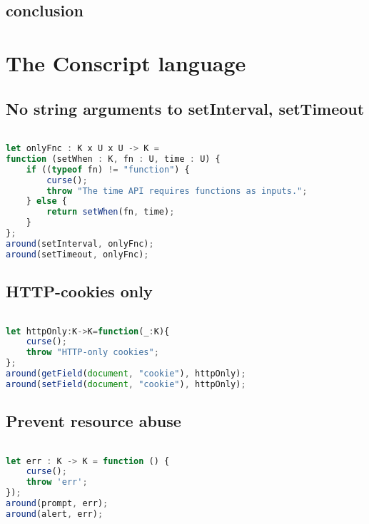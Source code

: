 \subsection{conclusion}

\section{The Conscript language}
\label{sec:ValidationConscript}

\subsection{No string arguments to setInterval, setTimeout}

\begin{lstlisting}[label={lst:Policy7Conscript},language=JavaScript,caption=Policy 7 in ConScript,mathescape=true]  % float=t?

let onlyFnc : K x U x U -> K =
function (setWhen : K, fn : U, time : U) {
    if ((typeof fn) != "function") {
        curse();
        throw "The time API requires functions as inputs.";
    } else {
        return setWhen(fn, time);
    }
};
around(setInterval, onlyFnc); 
around(setTimeout, onlyFnc);
\end{lstlisting}

\subsection{HTTP-cookies only}

\begin{lstlisting}[label={lst:Policy8Conscript},language=JavaScript,caption=Policy 8 in ConScript,mathescape=true]  % float=t?

let httpOnly:K->K=function(_:K){ 
    curse(); 
    throw "HTTP-only cookies"; 
};
around(getField(document, "cookie"), httpOnly); 
around(setField(document, "cookie"), httpOnly);
\end{lstlisting}

\subsection{Prevent resource abuse}

\begin{lstlisting}[label={lst:Policy9Conscript},language=JavaScript,caption=Policy 9 in ConScript,mathescape=true]  % float=t?

let err : K -> K = function () { 
    curse(); 
    throw 'err'; 
}); 
around(prompt, err); 
around(alert, err);
\end{lstlisting}

